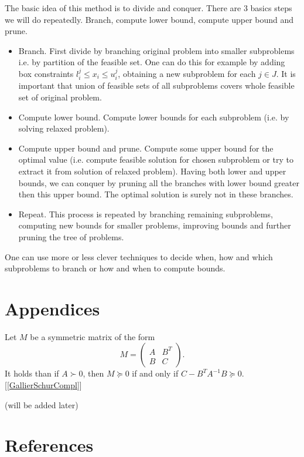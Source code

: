 \documentclass[10pt,oneside]{book}
\theoremstyle{definition}
\begin{document}
The basic idea of this method is to divide and conquer.
There are 3 basics steps we will do repeatedly. Branch, compute lower bound, compute upper bound and prune.
\begin{itemize}
\item Branch. First divide by branching original problem into smaller subproblems i.e. by partition of the feasible set. One can do this for example by adding box constraints $l^j_i\leq x_i \leq u^j_i$, obtaining a new subproblem for each $j\in J$.  It is important that union of feasible sets of all subproblems covers whole feasible set of original problem.
\item Compute lower bound. Compute lower bounds for each subproblem (i.e. by solving relaxed problem). 
\item Compute upper bound and prune. Compute some upper bound for the optimal value (i.e. compute feasible solution for chosen subproblem or try to extract it from solution of relaxed problem). Having both lower and upper bounds, we can conquer by pruning all the branches with lower bound greater then this upper bound. The optimal solution is surely not in these branches.
\item Repeat. This process is repeated by branching remaining subproblems, computing new bounds for smaller problems, improving bounds and further pruning the tree of problems.
\end{itemize}

One can use more or less clever techniques to decide when, how and which subproblems to branch or how and when to compute bounds.



\chapter{Appendices}

\label{SchurCompl}
Let $M$ be a symmetric matrix of the form
$$M = \left(\begin{array}{cc}
A & B^T\\
B & C
\end{array}\right).$$
It holds than if $A\succ 0$, then $M\succeq 0$ if and only if $C-B^TA^{-1}B\succeq 0$. \rm [\ref{GallierSchurCompl}]

\proof (will be added later)

\chapter*{References}
\end{document}
